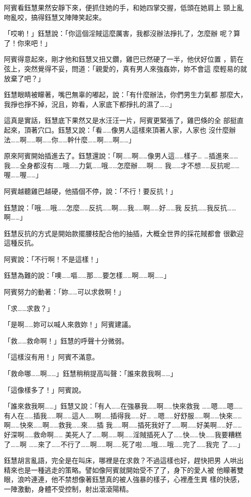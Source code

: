 阿賓看鈺慧果然安靜下來，便抓住她的手，和她四掌交握，低頭在她肩上
頸上亂吻亂咬，搞得鈺慧又陣陣笑起來。

「哎喲！」鈺慧說：「你這個淫賊這麼厲害，我都沒辦法掙扎了，怎麼辦
呢？算了！你來吧！」

阿賓得意起來，剛才他和鈺慧又扭又鑽，雞巴已然硬了一半，他伏好位置
，箭在弦上，突然覺得不妥，問道：「親愛的，真有男人來強姦妳，妳不會這
麼輕易的就放棄了吧？」

鈺慧眼睛被矇著，嘴巴無辜的嘟起，說：「有什麼辦法，你們男生力氣都
那麼大，我掙也掙不掉，況且，妳看，人家底下都掙扎的濕了……」

這真是實話，鈺慧底下果然又是水汪汪一片，阿賓更緊張了，雞巴倏的全
部挺直起來，頂著穴口。鈺慧又說：「看……像男人這樣來頂著人家，人家也
沒什麼辦法……啊……啊……你……幹什麼……啊……啊……」

原來阿賓開始插進去了。鈺慧還說：「啊……啊……像男人這……樣子…
…插進來……我……全身都沒有……哦……力氣……哦……怎麼辦……啊……
我……才不想……反抗呢……喔……喔……」

阿賓越聽雞巴越硬，他插個不停，說：「不行！要反抗！」

鈺慧說：「哦……哦……怎麼……反抗……啊……我……啊……好……我
反抗……我反抗……啊……」

鈺慧反抗的方式是開始款擺腰枝配合他的抽插，大概全世界的採花賊都會
很歡迎這種反抗。

阿賓說：「不行啊！不是這樣！」

鈺慧為難的說：「噢……嘔……那……要怎樣……啊……啊……」

阿賓努力的動著：「妳……可以求救啊！」

「求……求救？」

「是啊……妳可以喊人來救妳！」阿賓建議。

「救……救命啊！」鈺慧的呼聲十分微弱。

「這樣沒有用！」阿賓不滿意。

「救命哪……啊……」鈺慧稍稍提高叫聲：「誰來救我啊……」

「這像樣多了！」阿賓說。

「誰來救我啊……」鈺慧又說：「有人……在強暴我……啊……快來救我
……嗯……嗯……有人在……插我……啊……這人……啊……插得我……好…
…嗯……好舒服……啊……快來……啊……快來……啊……救我……來……插
我……啊……插死我好了……啊……好美啊……好……好深啊……救命啊……
美死人了……啊……啊……淫賊插死人了……快……快……我要糟糕了……啊
……來了……不行了……啊……啊……死了啦……哦……哦……完了……我完
了……」

鈺慧胡言亂語，完全是在叫床，哪裡是在求救？不過這樣也好，趕快把男
人哄出精來也是一種逃走的策略。譬如像阿賓就開始受不了了，身下的愛人被
他矇著雙眼，浪吟連連，他不禁想像著鈺慧真的被人強暴的樣子，心裡產生異
樣的快感，一陣激動，身體不受控制，射出滾滾陽精。

